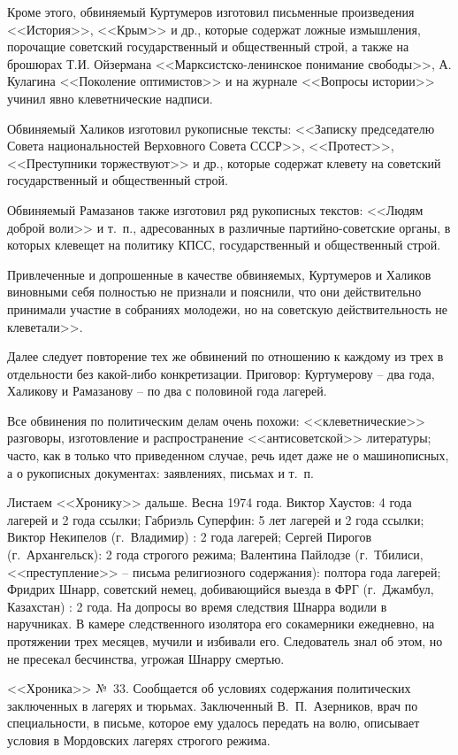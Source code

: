 \documentclass{book}
\begin{document}
Кроме этого, обвиняемый Куртумеров изготовил письменные произведения <<История>>, <<Крым>> и др., которые содер­жат ложные измышления, порочащие советский государственный и общественный строй, а также на брошюрах Т.И. Ойзермана <<Марксистско-ленинское понимание свободы>>, А. Кулагина <<Поколение оптимистов>> и на журнале <<Вопросы истории>> учинил явно клеветнические надписи.

Обвиняемый Халиков изготовил рукописные тексты: <<Записку председателю Совета национальностей Верховного Совета СССР>>, <<Протест>>, <<Преступники торжествуют>> и др., которые содержат клевету на советский государственный и общественный строй.

Обвиняемый Рамазанов также изготовил ряд рукописных текстов: <<Людям доброй воли>> и т.~п., адресованных в различные партийно-советские органы, в которых клевещет на поли­тику КПСС, государственный и общественный строй.

Привлеченные и допрошенные в качестве обвиняемых, Куртумеров и Халиков виновными себя полностью не признали и пояснили, что они действительно принимали участие в собраниях молодежи, но на советскую действительность не клеветали>>.

Далее следует повторение тех же обвинений по отношению к каждому из трех в отдельности без какой-либо конкретизации. Приговор: Куртумерову -- два года, Халикову и Рамазанову -- по два с половиной года лагерей.

Все обвинения по политическим делам очень похожи: <<клеветнические>> разговоры, изготовление и распространение <<антисоветской>> литературы; часто, как в только что приведенном случае, речь идет даже не о машинописных, а о рукописных документах: заявлениях, письмах и т.~п.

Листаем <<Хронику>> дальше. Весна 1974 года. Виктор Хаустов: 4 года лагерей и 2 года ссылки; Габриэль Суперфин:
5 лет лагерей и 2 года ссылки; Виктор Некипелов (г.~Владимир) : 2 года лагерей; Сергей Пирогов (г.~Архангельск): 2 го­да строгого режима; Валентина Пайлодзе (г.~Тбилиси, <<преступление>> -- письма религиозного содержания): полтора года лагерей; Фридрих Шнарр, советский немец, добивающийся выезда в ФРГ (г.~Джамбул, Казахстан) : 2 года. На допросы во время следствия Шнарра водили в наручниках. В камере след­ственного изолятора его сокамерники ежедневно, на протяжении трех месяцев, мучили и избивали его. Следователь знал об этом, но не пресекал бесчинства, угрожая Шнарру смертью.

<<Хроника>> №~33. Сообщается об условиях содержания политических заключенных в лагерях и тюрьмах. Заключенный В.~П.~Азерников, врач по специальности, в письме, которое ему удалось передать на волю, описывает условия в Мордовских лагерях строгого режима.
\end{document}
